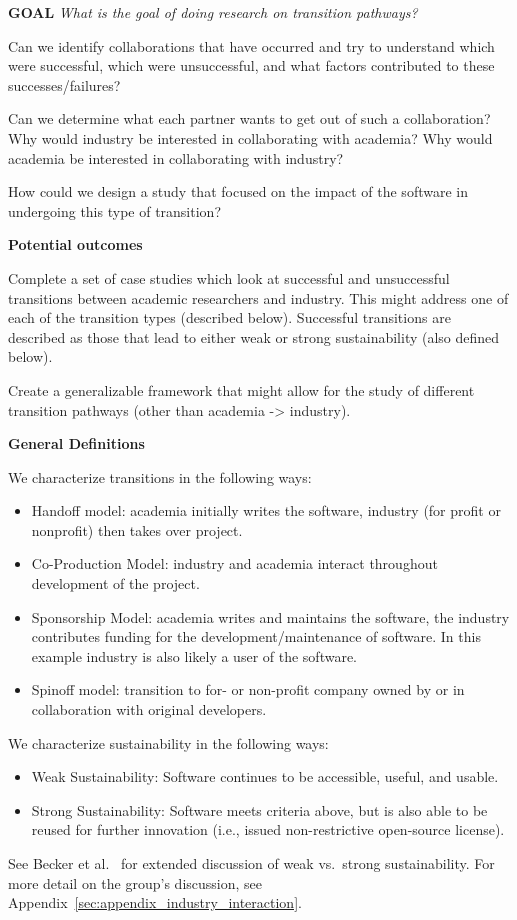 \textbf{GOAL}
\emph{What is the goal of doing research on transition pathways?} 

Can we identify collaborations that have occurred and try to understand which were successful, which were unsuccessful, and what factors contributed to these successes/failures? 

Can we determine what each partner wants to get out of such a collaboration?
Why would industry be interested in collaborating with academia? 
Why would academia be interested in collaborating with industry?

How could we design a study that focused on the impact of the software in
undergoing this type of transition?

\textbf{Potential outcomes}

Complete a set of case studies which look at successful and unsuccessful
transitions between academic researchers and industry. This might address one of
each of the transition types (described below). Successful transitions are
described as those that lead to either weak or strong sustainability (also
defined below).

Create a generalizable framework that might allow for the study of different
transition pathways (other than academia -> industry).

\textbf{General Definitions}

We characterize transitions in the following ways:
\begin{itemize}

\item Handoff model: academia initially writes the software, industry (for
profit or nonprofit) then takes over project.

\item Co-Production Model: industry and academia interact throughout development
of the project.

\item Sponsorship Model: academia writes and maintains the software, the
industry contributes funding for the development\slash maintenance of software.
In this example industry is also likely a user of the software.

\item Spinoff model: transition to for- or non-profit company owned by or in
collaboration with original developers.

\end{itemize}

We characterize sustainability in the following ways:
\begin{itemize}

\item Weak Sustainability: Software continues to be accessible, useful, and
usable.

\item Strong Sustainability: Software meets criteria above, but is also able to
be reused for further innovation (i.e., issued non-restrictive open-source
license).

\end{itemize}
See Becker et al.~\cite{Becker:2014} for extended discussion of weak vs.\ strong
sustainability. For more detail on the group's discussion, see
Appendix~\ref{sec:appendix_industry_interaction}.

